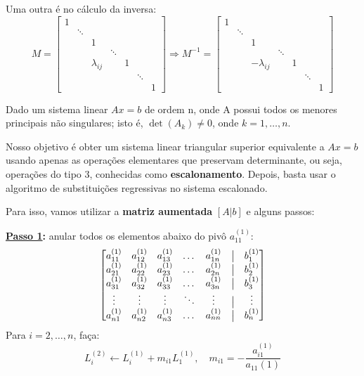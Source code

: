 \documentclass[../numerical_methods.tex]{subfiles}
\begin{document}
Uma outra é no cálculo da inversa:
\[
	M = \begin{bmatrix}
		1 &        &              &        &   &        &   \\
		  & \ddots &              &        &   &        &   \\
		  &        & 1            &        &   &        &   \\
		  &        &              & \ddots &   &        &   \\
		  &        & \lambda_{ij} &        & 1 &        &   \\
		  &        &              &        &   & \ddots &   \\
		  &        &              &        &   &        & 1
	\end{bmatrix}\Rightarrow M^{-1}=\begin{bmatrix}
		1 &        &               &        &   &        &   \\
		  & \ddots &               &        &   &        &   \\
		  &        & 1             &        &   &        &   \\
		  &        &               & \ddots &   &        &   \\
		  &        & -\lambda_{ij} &        & 1 &        &   \\
		  &        &               &        &   & \ddots &   \\
		  &        &               &        &   &        & 1
	\end{bmatrix}
\]

Dado um sistema linear \(Ax = b\) de ordem n, onde A possui todos os menores principais não singulares; isto é, \(\det{(A_{k})}\neq 0\), onde \(k=1, \dotsc , n\).

Nosso objetivo é obter um sistema linear triangular superior equivalente a \(Ax = b\) usando apenas as operações elementares que preservam determinante, ou seja, operações do tipo 3, conhecidas como \textbf{escalonamento}.
Depois, basta usar o algoritmo de substituições regressivas no sistema escalonado.

Para isso, vamos utilizar a \textbf{matriz aumentada} \([ A | b ]\) e alguns passos:

\textbf{\underline{Passo 1}:} anular todos os elementos abaixo do pivô \(a_{11}^{(1)}\):
\[
	\begin{bmatrix}
		a_{11}^{(1)} & a_{12}^{(1)} & a_{13}^{(1)} & \dotsc & a_{1n}^{(1)} & \bigm| & b_{1}^{(1)} \\
		a_{21}^{(1)} & a_{22}^{(1)} & a_{23}^{(1)} & \dotsc & a_{2n}^{(1)} & \bigm| & b_{2}^{(1)} \\
		a_{31}^{(1)} & a_{32}^{(1)} & a_{33}^{(1)} & \dotsc & a_{3n}^{(1)} & \bigm| & b_{3}^{(1)} \\
		\vdots       & \vdots       & \vdots       & \ddots & \vdots       & \bigm| & \vdots      \\
		a_{n1}^{(1)} & a_{n2}^{(1)} & a_{n3}^{(1)} & \dotsc & a_{nn}^{(1)} & \bigm| & b_{n}^{(1)} \\
	\end{bmatrix}
\]
Para \(i=2, \dotsc , n\), faça:
\[
	\boxed{L_{i}^{(2)}\leftarrow L_{i}^{(1)}+m_{i1}L_{1}^{(1)}, \quad m_{i1} = - \frac{a_{i1}^{(1)}}{a_{11}(1)}}
\]
\end{document}
